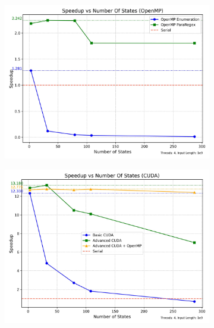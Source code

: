 \documentclass[sigconf]{acmart}
\begin{document}
\begin{figure}[t]
\begin{subfigure}{.33\textwidth}
		\caption{}
		\label{fig:SpeedupInputLengthCUDA}
	\end{subfigure}
	\begin{subfigure}{.33\textwidth}
		\centering
		\includegraphics[width=\linewidth]{number_of_states_omp}
		\caption{}
		\label{fig:SpeedupStateOMP}
	\end{subfigure}
	\begin{subfigure}{.33\textwidth}
		\centering
		\includegraphics[width=\linewidth]{number_of_states_cuda}
		\caption{}
		\label{fig:SpeedupStateCUDA}
	\end{subfigure}
	\begin{subfigure}{.33\textwidth}
		\centering

\end{subfigure}
\end{figure}
\end{document}
